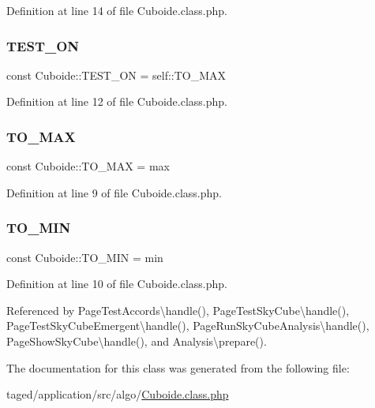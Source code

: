 Definition at line 14 of file Cuboide.\+class.\+php.

\mbox{\label{class_cuboide_addf8c5b96a0aa67d15fc9502e748546a}} 
\subsubsection{\texorpdfstring{T\+E\+S\+T\+\_\+\+ON}{TEST\_ON}}
{\footnotesize\ttfamily const Cuboide\+::\+T\+E\+S\+T\+\_\+\+ON = self\+::\+T\+O\+\_\+\+M\+AX}



Definition at line 12 of file Cuboide.\+class.\+php.

\mbox{\label{class_cuboide_afd49ea48fafb0362d27f78f6f4ef8b84}} 
\subsubsection{\texorpdfstring{T\+O\+\_\+\+M\+AX}{TO\_MAX}}
{\footnotesize\ttfamily const Cuboide\+::\+T\+O\+\_\+\+M\+AX = \textquotesingle{}max\textquotesingle{}}



Definition at line 9 of file Cuboide.\+class.\+php.

\mbox{\label{class_cuboide_aa9d05eb5bedc8406d495de6132fb693b}} 
\subsubsection{\texorpdfstring{T\+O\+\_\+\+M\+IN}{TO\_MIN}}
{\footnotesize\ttfamily const Cuboide\+::\+T\+O\+\_\+\+M\+IN = \textquotesingle{}min\textquotesingle{}}



Definition at line 10 of file Cuboide.\+class.\+php.



Referenced by Page\+Test\+Accords\textbackslash{}handle(), Page\+Test\+Sky\+Cube\textbackslash{}handle(), Page\+Test\+Sky\+Cube\+Emergent\textbackslash{}handle(), Page\+Run\+Sky\+Cube\+Analysis\textbackslash{}handle(), Page\+Show\+Sky\+Cube\textbackslash{}handle(), and Analysis\textbackslash{}prepare().



The documentation for this class was generated from the following file\+:\begin{DoxyCompactItemize}
\item 
taged/application/src/algo/\hyperlink{_cuboide_8class_8php}{Cuboide.\+class.\+php}\end{DoxyCompactItemize}
